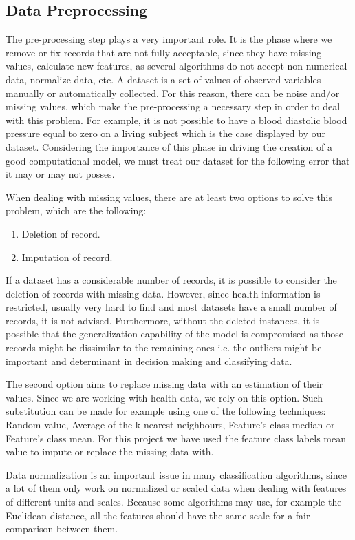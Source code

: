 \documentclass[12pt]{article}
\begin{document}
\clearpage
\newpage
\subsection{Data Preprocessing}
The pre-processing step plays a very important role. It is the phase where we remove or
fix records that are not fully acceptable, since they have missing values, calculate new
features, as several algorithms do not accept non-numerical data, normalize data, etc.
A dataset is a set of values of observed variables manually or automatically collected.
For this reason, there can be noise and/or missing values, which make the pre-processing
a necessary step in order to deal with this problem. For example, it is not possible to have a blood diastolic blood pressure equal to zero on a living subject which is the case displayed by our dataset.
Considering the importance of this phase in driving the creation of a good computational
model, we must treat our dataset for the following error that it may or may not posses.

When dealing with missing values, there are at least two options to solve this problem,
which are the following:
\begin{enumerate}
\item Deletion of record.
\item Imputation of record.
\end{enumerate}
If a dataset has a considerable number of records, it is possible to consider the deletion of records with missing data. However, since health information is restricted, usually very hard to find and most datasets have a small number of records, it is not advised. Furthermore, without the deleted instances, it is possible that the generalization capability of the model is
compromised as those records might be dissimilar to the remaining ones i.e. the outliers might be important and determinant in decision making and classifying data.\cite{cleandata}

The second option aims to replace missing data with an estimation of their values.
Since we are working with health data, we rely on this option. Such substitution can be
made for example using one of the following techniques: Random value, Average of the
k-nearest neighbours, Feature’s class median or Feature’s class mean. For this project we have used the feature class labels mean value to impute or replace the missing data with.

Data normalization is an important issue in many classification algorithms, since a lot
of them only work on normalized or scaled data when dealing with features of different
units and scales. Because some algorithms may use, for example the Euclidean distance,
all the features should have the same scale for a fair comparison between them.\cite{datanormal}
\end{document}
